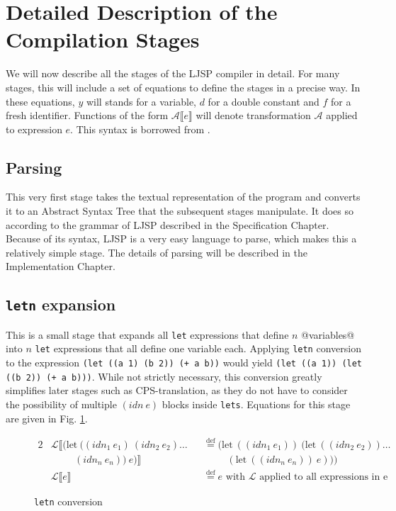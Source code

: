 \documentclass[11pt]{report}
\newcommand{\eqdef}{\stackrel{\text{def}}{=}}%
\begin{document}
\section{Detailed Description of the Compilation Stages}
We will now describe all the stages of the LJSP compiler in detail. For many stages, this will include a set of equations to define the stages in a precise way. In these equations, $y$ will stands for a variable, $d$ for a double constant and $f$ for a fresh identifier. Functions of the form $\mathcal{A}\llbracket e \rrbracket$ will denote transformation $\mathcal{A}$ applied to expression $e$. This syntax is borrowed from \cite{sysftal}.

\subsection{Parsing}
This very first stage takes the textual representation of the program and converts it to an Abstract Syntax Tree that the subsequent stages manipulate. It does so according to the grammar of LJSP described in the Specification Chapter. Because of its syntax, LJSP is a very easy language to parse, which makes this a relatively simple stage. The details of parsing will be described in the Implementation Chapter.

\subsection{\texttt{letn} expansion}
This is a small stage that expands all \texttt{let} expressions that define $n$ @variables@ into $n$ \texttt{let} expressions that all define one variable each. Applying \texttt{letn} conversion to the expression \texttt{(let ((a 1) (b 2)) (+ a b))} would yield \texttt{(let ((a 1)) (let ((b 2)) (+ a b)))}. While not strictly necessary, this conversion greatly simplifies later stages such as CPS-translation, as they do not have to consider the possibility of multiple $(idn\ e)$ blocks inside \texttt{lets}. Equations for this stage are given in Fig. \ref{letnconversion}.

\begin{figure}[ht]
\begin{alignat*}{2}
&\mathcal{L}\llbracket (\text{let}\ ((idn_1\ e_1)\ (idn_2\ e_2)\dots &&\eqdef (\text{let}\ ((idn_1\ e_1))\ (\text{let}\ ((idn_2\ e_2)) \dots \\
&\hspace{1cm} (idn_n\ e_n))\ e)\rrbracket &&\hspace{1cm}(\text{let}\ ((idn_n\ e_n))\ e)))\\
&\mathcal{L}\llbracket e \rrbracket && \eqdef e\text{ with $\mathcal{L}$ applied to all expressions in e}
\end{alignat*}
\caption{\texttt{letn} conversion}
\label{letnconversion}
\end{figure}
\end{document}
